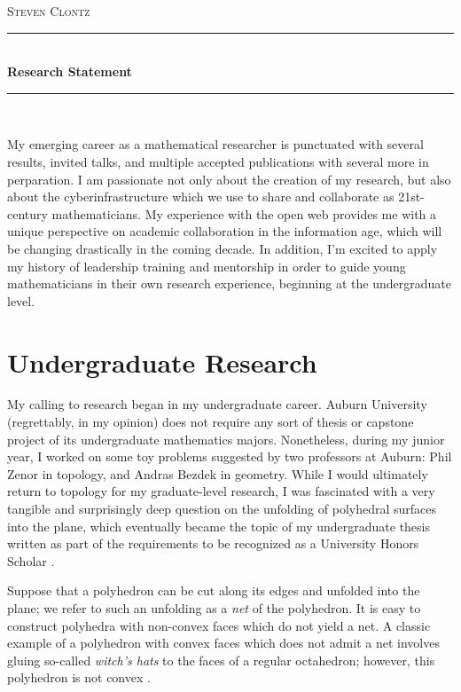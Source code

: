 \documentclass[11pt]{amsart}
\theoremstyle{plain}
\newcommand{\HRule}{\rule{\linewidth}{0.5mm}}
\newcommand{\<}{\langle}
\renewcommand{\>}{\rangle}
\newcommand{\term}{\textit}
\begin{document}
\begin{center}

\textsc{\huge Steven Clontz}

\HRule \\[0.1cm]
{ \huge \bfseries Research Statement \\[0.4cm] }

\HRule \\[1.5cm]

\end{center}


My emerging career as a mathematical researcher is punctuated with several
results, invited talks, and multiple accepted publications with several
more in perparation. I am passionate not
only about the creation of my research, but
also about the cyberinfrastructure which we use to share and collaborate
as 21st-century mathematicians. My
experience with the open web provides me with a unique perspective on academic
collaboration in the information age, which will be changing drastically
in the coming decade. In addition, I'm excited to apply my history of
leadership training and mentorship in order to guide young mathematicians
in their own research experience, beginning at the undergraduate level.


\section*{Undergraduate Research}

My calling to research began in my undergraduate career. Auburn University
(regrettably, in my opinion) does not require any sort of thesis or capstone
project of its undergraduate mathematics majors. Nonetheless, during my junior
year, I worked on some toy problems suggested by two professors at Auburn:
Phil Zenor in topology, and Andras Bezdek in geometry. While I would ultimately
return to topology for my graduate-level research, I was fascinated with a
very tangible and surprisingly deep question on the unfolding of polyhedral
surfaces into the plane, which eventually became the topic of my undergraduate
thesis written as part of the requirements to be recognized as a University
Honors Scholar \cite{UNDERGRAD}.

Suppose that a polyhedron can be cut along its edges and unfolded into
the plane; we refer to such an unfolding as a \term{net} of the polyhedron.
It is easy to construct polyhedra with non-convex faces which do not
yield a net. A classic example of a polyhedron with convex faces which does
not admit a net involves gluing so-called \term{witch's hats} to the faces
of a regular octahedron; however, this polyhedron is not convex
\cite{UNUNFOLDABLE}.
\end{document}
